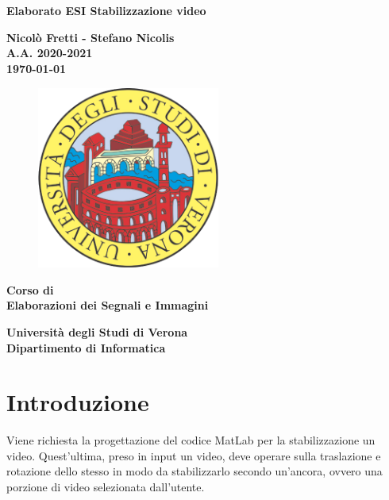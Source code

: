 \documentclass[12pt]{article}
\begin{document}
\begin{titlepage}
   \begin{center}
       \vspace*{1cm}
 
	\large
      {\huge \textbf{Elaborato ESI Stabilizzazione video} }
 
       \vspace{1.5cm}
 
       \textbf{Nicolò Fretti - Stefano Nicolis}\\
	\textbf{A.A. 2020-2021}\\
	\vspace{0.35cm}
	\textbf{\today}

\vfill
\begin{figure}[h!]
	\begin{center}
	  \includegraphics[height=6cm, width=6cm]{media/logounivr}
	\end{center}
\end{figure}
 
	\vfill
 	\textbf{Corso di \\
       Elaborazioni dei Segnali e Immagini\\}
 
       \vspace{3cm}
 
      \begin{multicols}{2}
      \textbf{Università degli Studi di Verona\\
	 Dipartimento di Informatica}
	\end{multicols}
 
   \end{center}
\end{titlepage}


\tableofcontents

\section{Introduzione}
Viene richiesta la progettazione del codice MatLab per la stabilizzazione un video. Quest'ultima, preso in input un video, deve operare sulla traslazione e rotazione dello stesso in modo da stabilizzarlo secondo un'ancora, ovvero una porzione di video selezionata dall'utente.
\end{document}

